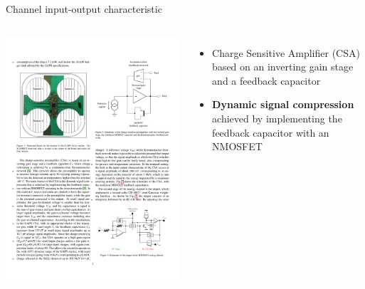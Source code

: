 \documentclass[aspectratio=169,xcolor=dvipsnames,handout]{beamer} %
\begin{document}
\begin{frame}{Channel input-output characteristic}
\fontsize{8.5pt}{1}\selectfont
    \begin{columns}
        \addtolength{\leftmargini}{\labelsep}

        \vspace{-0.25cm}
        \begin{center}
             \includegraphics[height=0.55\textheight]{images/temperature_effects/CSA_schematic.pdf}
        \end{center}

        \vskip-0.2cm
        \begin{itemize}
            \item Charge Sensitive Amplifier (CSA) based on an inverting gain stage and a feedback capacitor
            \item \textbf{Dynamic signal compression} achieved by implementing the feedback capacitor with an NMOSFET
        \end{itemize}


\end{columns}
\end{frame}
\end{document}
